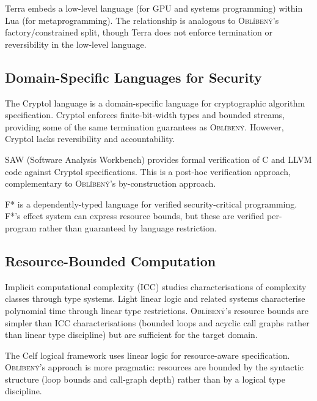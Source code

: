 \documentclass[11pt,a4paper]{article}
\newcommand{\obl}{\textsc{Obl\'{i}ben\'{y}}}
\begin{document}
Terra \citep{devito2013terra} embeds a low-level language (for GPU and
systems programming) within Lua (for metaprogramming).  The relationship is
analogous to \obl{}'s factory/constrained split, though Terra does not enforce
termination or reversibility in the low-level language.

\subsection{Domain-Specific Languages for Security}

The Cryptol language \citep{lewis2003cryptol} is a domain-specific language
for cryptographic algorithm specification.  Cryptol enforces finite-bit-width
types and bounded streams, providing some of the same termination guarantees
as \obl{}.  However, Cryptol lacks reversibility and accountability.

SAW (Software Analysis Workbench) \citep{dockins2016saw} provides formal
verification of C and LLVM code against Cryptol specifications.  This is a
post-hoc verification approach, complementary to \obl{}'s by-construction
approach.

F* \citep{swamy2016dependent} is a dependently-typed language for verified
security-critical programming.  F*'s effect system can express resource
bounds, but these are verified per-program rather than guaranteed by language
restriction.

\subsection{Resource-Bounded Computation}

Implicit computational complexity (ICC) \citep{dal2010linear} studies
characterisations of complexity classes through type systems.  Light linear
logic \citep{girard1998light} and related systems characterise polynomial
time through linear type restrictions.  \obl{}'s resource bounds are simpler
than ICC characterisations (bounded loops and acyclic call graphs rather than
linear type discipline) but are sufficient for the target domain.

The Celf logical framework \citep{schack2015celf} uses linear logic for
resource-aware specification.  \obl{}'s approach is more pragmatic: resources
are bounded by the syntactic structure (loop bounds and call-graph depth)
rather than by a logical type discipline.


\end{document}

